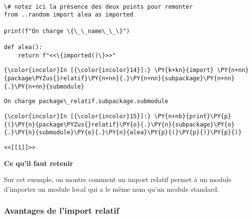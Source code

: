     \begin{Verbatim}[commandchars=\\\{\},frame=single,framerule=0.3mm,rulecolor=\color{cellframecolor}]

\# notez ici la présence des deux points pour remonter
from ..random import alea as imported

print(f"On charge \{\_\_name\_\_\}")

def alea():
    return f"<<\{imported()\}>>"
\end{Verbatim}

    \begin{Verbatim}[commandchars=\\\{\},frame=single,framerule=0.3mm,rulecolor=\color{cellframecolor}]
{\color{incolor}In [{\color{incolor}14}]:} \PY{k+kn}{import} \PY{n+nn}{package\PYZus{}relatif}\PY{n+nn}{.}\PY{n+nn}{subpackage}\PY{n+nn}{.}\PY{n+nn}{submodule}
\end{Verbatim}


    \begin{Verbatim}[commandchars=\\\{\},frame=single,framerule=0.3mm,rulecolor=\color{cellframecolor}]
On charge package\_relatif.subpackage.submodule
\end{Verbatim}

    \begin{Verbatim}[commandchars=\\\{\},frame=single,framerule=0.3mm,rulecolor=\color{cellframecolor}]
{\color{incolor}In [{\color{incolor}15}]:} \PY{n+nb}{print}\PY{p}{(}\PY{n}{package\PYZus{}relatif}\PY{o}{.}\PY{n}{subpackage}\PY{o}{.}\PY{n}{submodule}\PY{o}{.}\PY{n}{alea}\PY{p}{(}\PY{p}{)}\PY{p}{)}
\end{Verbatim}


    \begin{Verbatim}[commandchars=\\\{\},frame=single,framerule=0.3mm,rulecolor=\color{cellframecolor}]
<<[[1]]>>
\end{Verbatim}

    \textbf{Ce qu'il faut retenir}

Sur cet exemple, on montre comment un import relatif permet à un module
d'importer un module local qui a le même nom qu'un module standard.

    \hypertarget{avantages-de-limport-relatif}{%
\subsubsection{Avantages de l'import
relatif}\label{avantages-de-limport-relatif}}

